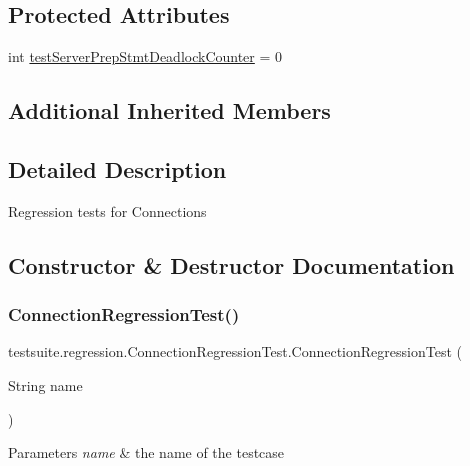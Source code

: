 \subsection*{Protected Attributes}
\begin{DoxyCompactItemize}
\item 
int \mbox{\hyperlink{classtestsuite_1_1regression_1_1_connection_regression_test_abbdb58ac7596236d509c07f48d6dc396}{test\+Server\+Prep\+Stmt\+Deadlock\+Counter}} = 0
\end{DoxyCompactItemize}
\subsection*{Additional Inherited Members}


\subsection{Detailed Description}
Regression tests for Connections 

\subsection{Constructor \& Destructor Documentation}
\mbox{\label{classtestsuite_1_1regression_1_1_connection_regression_test_aafc0f9ce5c17349773526cb4dc1d0cd7}} 
\subsubsection{\texorpdfstring{Connection\+Regression\+Test()}{ConnectionRegressionTest()}}
{\footnotesize\ttfamily testsuite.\+regression.\+Connection\+Regression\+Test.\+Connection\+Regression\+Test (\begin{DoxyParamCaption}\item[{String}]{name }\end{DoxyParamCaption})}


\begin{DoxyParams}{Parameters}
{\em name} & the name of the testcase \\
\hline
\end{DoxyParams}


